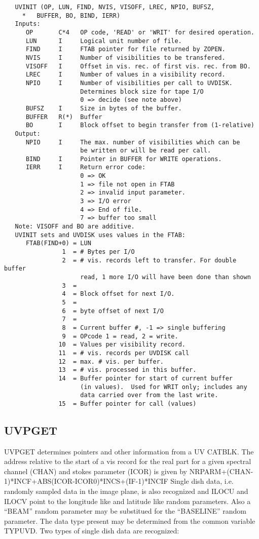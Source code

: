 \begin{verbatim}
   UVINIT (OP, LUN, FIND, NVIS, VISOFF, LREC, NPIO, BUFSZ,
     *   BUFFER, BO, BIND, IERR)
   Inputs:
      OP       C*4   OP code, 'READ' or 'WRIT' for desired operation.
      LUN      I     Logical unit number of file.
      FIND     I     FTAB pointer for file returned by ZOPEN.
      NVIS     I     Number of visibilities to be transfered.
      VISOFF   I     Offset in vis. rec. of first vis. rec. from BO.
      LREC     I     Number of values in a visibility record.
      NPIO     I     Number of visibilities per call to UVDISK.
                     Determines block size for tape I/O
                     0 => decide (see note above)
      BUFSZ    I     Size in bytes of the buffer.
      BUFFER   R(*)  Buffer
      BO       I     Block offset to begin transfer from (1-relative)
   Output:
      NPIO     I     The max. number of visibilities which can be
                     be written or will be read per call.
      BIND     I     Pointer in BUFFER for WRITE operations.
      IERR     I     Return error code:
                     0 => OK
                     1 => file not open in FTAB
                     2 => invalid input parameter.
                     3 => I/O error
                     4 => End of file.
                     7 => buffer too small
   Note: VISOFF and BO are additive.
   UVINIT sets and UVDISK uses values in the FTAB:
      FTAB(FIND+0) = LUN
                1  = # Bytes per I/O
                2  = # vis. records left to transfer. For double buffer
                     read, 1 more I/O will have been done than shown
                3  =
                4  = Block offset for next I/O.
                5  =
                6  = byte offset of next I/O
                7  =
                8  = Current buffer #, -1 => single buffering
                9  = OPcode 1 = read, 2 = write.
               10  = Values per visibility record.
               11  = # vis. records per UVDISK call
               12  = max. # vis. per buffer.
               13  = # vis. processed in this buffer.
               14  = Buffer pointer for start of current buffer
                     (in values).  Used for WRIT only; includes any
                     data carried over from the last write.
               15  = Buffer pointer for call (values)
\end{verbatim}

\subsection{UVPGET}
UVPGET determines pointers and other information from a UV CATBLK.
The address relative to the start of a vis record for the real part
for a given spectral channel (CHAN) and stokes parameter (ICOR)
is given by  NRPARM+(CHAN-1)*INCF+ABS(ICOR-ICOR0)*INCS+(IF-1)*INCIF
Single dish data, i.e. randomly sampled data in the image plane, is
also recognized and ILOCU and ILOCV point to the longitude like and
latitude like random parameters.  Also a ``BEAM'' random parameter
may be substitued for the ``BASELINE'' random parameter.  The data
type present may be determined from the common variable TYPUVD.
   Two types of single dish data are recognized:


